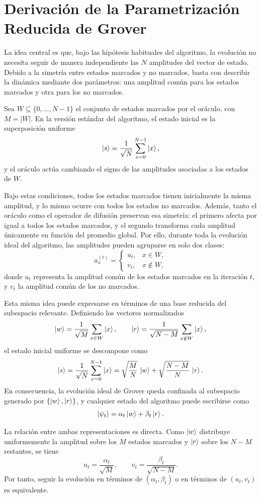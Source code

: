 \section{Derivación de la Parametrización Reducida de Grover}
\label{ap:grover_reducido}

La idea central es que, bajo las hipótesis habituales del algoritmo,
la evolución no necesita seguir de manera independiente las \(N\) amplitudes del vector de
estado. Debido a la simetría entre estados marcados y no marcados, basta con describir la
dinámica mediante dos parámetros: una amplitud común para los estados marcados y otra
para los no marcados.

Sea \(W \subseteq \{0,\dots,N-1\}\) el conjunto de estados marcados por el oráculo, con
\(M = |W|\). En la versión estándar del algoritmo, el estado inicial es la superposición
uniforme
\[
\ket{s}=\frac{1}{\sqrt{N}}\sum_{x=0}^{N-1}\ket{x},
\]
y el oráculo actúa cambiando el signo de las amplitudes asociadas a los estados de \(W\).

Bajo estas condiciones, todos los estados marcados tienen inicialmente la misma amplitud,
y lo mismo ocurre con todos los estados no marcados. Además, tanto el oráculo como el
operador de difusión preservan esa simetría: el primero afecta por igual a todos los estados
marcados, y el segundo transforma cada amplitud únicamente en función del promedio global.
Por ello, durante toda la evolución ideal del algoritmo, las amplitudes pueden agruparse en
solo dos clases:
\[
a_x^{(t)}=
\begin{cases}
u_t, & x\in W,\\[4pt]
v_t, & x\notin W,
\end{cases}
\]
donde \(u_t\) representa la amplitud común de los estados marcados en la iteración \(t\),
y \(v_t\) la amplitud común de los no marcados.

Esta misma idea puede expresarse en términos de una base reducida del subespacio relevante.
Definiendo los vectores normalizados
\[
\ket{w}=\frac{1}{\sqrt{M}}\sum_{x\in W}\ket{x},
\qquad
\ket{r}=\frac{1}{\sqrt{N-M}}\sum_{x\notin W}\ket{x},
\]
el estado inicial uniforme se descompone como
\[
\ket{s}
=
\frac{1}{\sqrt{N}}\sum_{x=0}^{N-1}\ket{x}
=
\sqrt{\frac{M}{N}}\,\ket{w}
+
\sqrt{\frac{N-M}{N}}\,\ket{r}.
\]
En consecuencia, la evolución ideal de Grover queda confinada al subespacio generado por
\(\{\ket{w},\ket{r}\}\), y cualquier estado del algoritmo puede escribirse como
\[
\ket{\psi_t}=\alpha_t \ket{w}+\beta_t \ket{r}.
\]

La relación entre ambas representaciones es directa. Como \(\ket{w}\) distribuye
uniformemente la amplitud sobre los \(M\) estados marcados y \(\ket{r}\) sobre los
\(N-M\) restantes, se tiene
\[
u_t=\frac{\alpha_t}{\sqrt{M}},
\qquad
v_t=\frac{\beta_t}{\sqrt{N-M}}.
\]
Por tanto, seguir la evolución en términos de \((\alpha_t,\beta_t)\) o en términos de
\((u_t,v_t)\) es equivalente.

